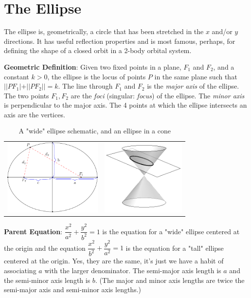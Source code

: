 \documentclass[11pt]{article}
\author{}
\date{}
\let\oldsection\section
\renewcommand{\section}[1]{\clearpage\oldsection{#1}}
\begin{document}
\hypertarget{the-ellipse}{%
\section{The Ellipse}\label{the-ellipse}}

The ellipse is, geometrically, a circle that has been stretched in the
\(x\) and/or \(y\) directions. It has useful reflection properties and
is most famous, perhaps, for defining the shape of a closed orbit in a
2-body orbital system.

\textbf{Geometric Definition}: Given two fixed points in a plane,
\(F_1\) and \(F_2\), and a constant \(k > 0\), the ellipse is the locus
of points \(P\) in the same plane such that \(||PF_1| + ||PF_2|| = k\).
The line through \(F_1\) and \(F_2\) is the \emph{major axis} of the
ellipse. The two points \(F_1,F_2\) are the \emph{foci} (singular:
\emph{focus}) of the ellipse. The \emph{minor axis} is perpendicular to
the major axis. The 4 points at which the ellipse intersects an axis are
the vertices.

\begin{table}[ht]
	\centering
	\begin{tabular}{cc}
		\includegraphics[width=\textwidth,height=1.5in]{ellipse-schematic.pdf} &
		\includegraphics[width=\textwidth,height=1.5in]{conic_ellipse.png}
	\end{tabular}
	\caption*{A "wide" ellipse schematic, and an ellipse in a cone}
\end{table}

\textbf{Parent Equation}: \(\dfrac{x^2}{a^2}+\dfrac{y^2}{b^2}=1\) is the
equation for a "wide" ellipse centered at the origin and the equation
\(\dfrac{x^2}{b^2}+\dfrac{y^2}{a^2}=1\) is the
equation for a "tall" ellipse centered at the origin. Yes, they are the same,
it's just we have a habit of associating $a$ with the larger denominator.
The semi-major axis
length is $a$ and the semi-minor axis length is $b$.
(The major and minor axis lengths are twice the semi-major axis and
semi-minor axis lengths.)
\end{document}
